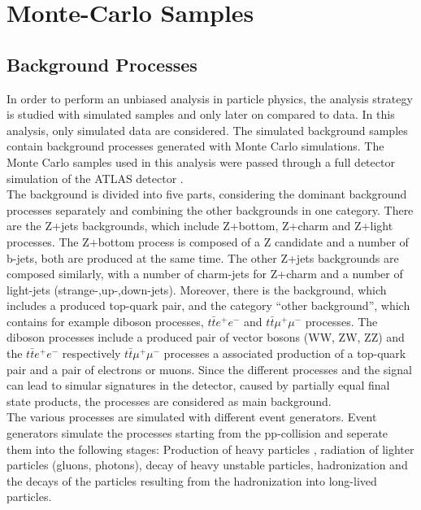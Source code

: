 \chapter{Monte-Carlo Samples}

\section{Background Processes}
\label{samples}
In order to perform an unbiased analysis in particle physics, the analysis strategy is studied with simulated samples and only later on compared to data.
In this analysis, only simulated data are considered.
The simulated background samples contain background processes generated with Monte Carlo simulations.
The Monte Carlo samples used in this analysis were passed through a full detector simulation of the ATLAS detector \cite{simulation1, simulation2}.\\
The background is divided into five parts, considering the dominant background processes separately and combining the other backgrounds in one category.
There are the Z+jets backgrounds, which include Z+bottom, Z+charm and Z+light processes.
The Z+bottom process is composed of a Z candidate and a number of b-jets, both are produced at the same time.
The other Z+jets backgrounds are composed similarly, with a number of charm-jets for Z+charm and a number of light-jets (strange-,up-,down-jets).
Moreover, there is the \ttbar{} background, which includes a produced top-quark pair, and the category ``other background'', which contains for example diboson processes, $t \bar{t} e^{+}\!e^{-}$ and $t \bar{t} \mu^{+}\!\mu^{-}$ processes.
The diboson processes include a produced pair of vector bosons (WW, ZW, ZZ) and the $t \bar{t} e^{+}\!e^{-}$ respectively $t \bar{t} \mu^{+}\!\mu^{-}$ processes a associated production of a top-quark pair and a pair of electrons or muons.
Since the different processes and the signal can lead to simular signatures in the detector, caused by partially equal final state products, the processes are considered as main background. \\
The various processes are simulated with different event generators.
Event generators simulate the processes starting from the pp-collision and seperate them into the following stages:
Production of heavy particles , radiation of lighter particles (gluons, photons), decay of heavy unstable particles, hadronization and the decays of the particles resulting from the hadronization into long-lived particles. 

